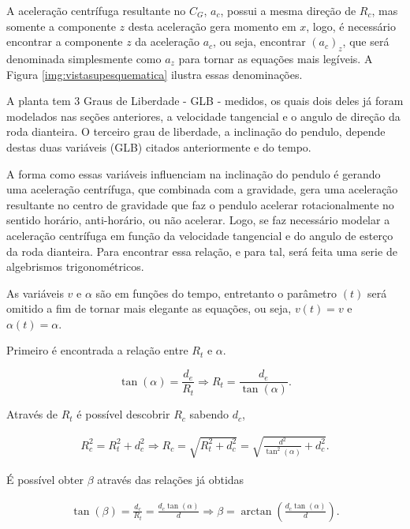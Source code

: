         A aceleração centrífuga resultante no $C_G$, $a_c$, possui a mesma direção de $R_c$, mas somente a componente $z$ desta aceleração gera momento em $x$, logo, é necessário encontrar a componente $z$ da aceleração $a_c$, ou seja, encontrar $(a_c)_{z}$, que será denominada simplesmente como $a_z$ para tornar as equações mais legíveis. A Figura \ref{img:vistasupesquematica} ilustra essas denominações.
        
	    A planta tem 3 Graus de Liberdade - GLB - medidos, os quais dois deles já foram modelados nas seções anteriores, a velocidade tangencial e o angulo de direção da roda dianteira. O terceiro grau de liberdade, a inclinação do pendulo, depende destas duas variáveis (GLB) citados anteriormente e do tempo.
    
        A forma como essas variáveis influenciam na inclinação do pendulo é gerando uma aceleração centrífuga, que combinada com a gravidade, gera uma aceleração resultante no centro de gravidade que faz o pendulo acelerar rotacionalmente no sentido horário, anti-horário, ou não acelerar. Logo, se faz necessário modelar a aceleração centrífuga em função da velocidade tangencial e do angulo de esterço da roda dianteira. Para encontrar essa relação, e para tal, será feita uma serie de algebrismos trigonométricos.
        
        As variáveis $v$ e $\alpha$ são em funções do tempo, entretanto o parâmetro $(t)$ será omitido a fim de tornar mais elegante as equações, ou seja, $v(t) = v$ e $\alpha(t) = \alpha$.
        
        Primeiro é encontrada a relação entre $R_t$ e $\alpha$.
        
        \begin{equation}
            \tan(\alpha) = \frac{d_e}{R_t} \Rightarrow R_t = \frac{d_e}{\tan(\alpha)}.
        \end{equation}
        
        Através de $R_t$ é possível descobrir $R_c$ sabendo $d_c$,
        
        \begin{eqnarray}
            R_c^2 = R_t^2 + d_c^2 \Rightarrow R_c = \sqrt{R_t^2 + d_c^2} = \sqrt{\frac{d^2}{\tan^2(\alpha)} + d_c^2}.
            \label{eq:rc}
        \end{eqnarray}
        
        É possível obter $\beta$ através das relações já obtidas
        
        \begin{eqnarray}
            \tan(\beta) = \frac{d_c}{R_t} = \frac{d_c \tan(\alpha)}{d}  \Rightarrow \beta = \arctan ( \frac{d_c \tan (\alpha) }{d} ).
            \label{eq:beta}
        \end{eqnarray}
        

